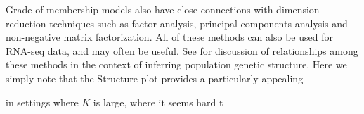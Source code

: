 


Grade of membership models also have close connections with dimension reduction techniques such as factor analysis, principal components analysis and non-negative matrix factorization. All of these methods can also be used for RNA-seq data, and may often be useful. See  \cite{engelhardt.stephens.xx} for discussion of 
relationships among these methods in the context of inferring population genetic structure. Here we simply note that the Structure plot provides
a particularly appealing 

in settings where $K$ is large, where it seems hard t 


